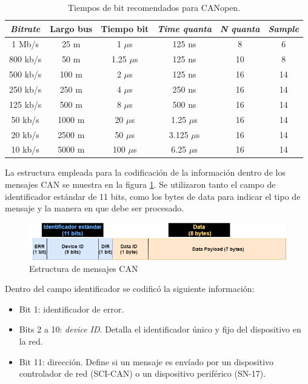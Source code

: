 \newpage

\begin{table}[h!]
	\centering
	\caption[Tiempos de bit recomendados para CANopen.]{Tiempos de bit recomendados para CANopen.}
	\begin{tabular}{c c c c c c}    
		\toprule
		\textbf{\textit{Bitrate}} & \textbf{Largo bus} & \textbf{Tiempo bit} & \textbf{\textit{Time quanta}} & \textbf{\textit{N quanta}} & \textbf{\textit{Sample}} \\
		\midrule
		1 Mb/s 		& 25 m 	& 1 $\mu$s		& 125 ns & 8 	& 6 \\
		800 kb/s 	& 50 m 	& 1.25 $\mu$s	& 125 ns & 10 	& 8 \\
		500 kb/s 	& 100 m & 2 $\mu$s		& 125 ns & 16 	& 14 \\
		250 kb/s 	& 250 m & 4 $\mu$s		& 250 ns & 16 	& 14 \\
		125 kb/s 	& 500 m & 8 $\mu$s		& 500 ns & 16 	& 14 \\
		50 kb/s 	& 1000 m & 20 $\mu$s	& 1.25 $\mu$s & 16 	& 14 \\
		20 kb/s 	& 2500 m & 50 $\mu$s	& 3.125 $\mu$s & 16 	& 14 \\
		10 kb/s 	& 5000 m & 100 $\mu$s	& 6.25 $\mu$s & 16 	& 14 \\
		\bottomrule
		\hline
	\end{tabular}
	\label{tab:bit_times}
\end{table}

La estructura empleada para la codificación de la información dentro de los mensajes CAN se muestra en la figura \ref{fig:estructura_mensajes}. Se utilizaron tanto el campo de identificador estándar de 11 bits, como los bytes de data para indicar el tipo de mensaje y la manera en que debe ser procesado.

\begin{figure}[h!]
	\centering
	\includegraphics[width=1\linewidth ,height=0.12\textheight]{./Figures/estructura_mensaje.png}
	\caption{Estructura de mensajes CAN}
	\label{fig:estructura_mensajes}
\end{figure}

Dentro del campo identificador se codificó la siguiente información:
\begin{itemize}
	\item Bit 1: identificador de error.
	\item Bits 2 a 10: \textit{device ID}. Detalla el identificador único y fijo del dispositivo en la red.
	\item Bit 11: dirección. Define si un mensaje es envíado por un dispositivo controlador de red (SCI-CAN) o un dispositivo periférico (SN-17).
\end{itemize}

